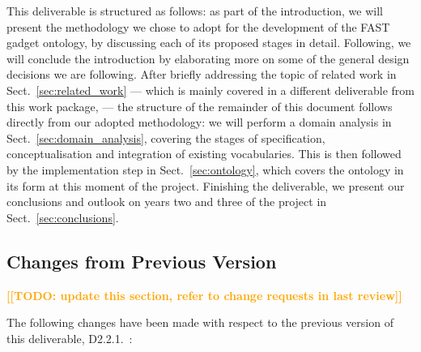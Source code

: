 \documentclass[twoside]{fast_latex}
\newcommand{\todo}[1]{\textsf{\textbf{\textcolor{Orange}{[[TODO: #1]]}}}}
\newcommand{\todo}[1]{}
\begin{document}
This deliverable is structured as follows: as part of the introduction, we will present the methodology we chose to adopt for the development of the FAST gadget ontology, by discussing  each of its proposed stages in detail. Following, we will conclude the introduction by elaborating more on some of the general design decisions we are following. After briefly addressing the topic of related work in Sect.~\ref{sec:related_work} --- which is mainly covered in a different deliverable from this work package, \cite{urmetzer2010fast_state_of_the_art} --- the structure of the remainder of this document follows directly from our adopted methodology: we will perform a domain analysis in Sect.~\ref{sec:domain_analysis}, covering the stages of specification, conceptualisation and integration of existing vocabularies. This is then followed by the implementation step in Sect.~\ref{sec:ontology}, which covers the ontology in its form at this moment of the project. Finishing the deliverable, we present our conclusions and outlook on years two and three of the project in Sect.~\ref{sec:conclusions}.


\subsection{Changes from Previous Version} %
\label{sub:changes_from_previous_version}

\todo{update this section, refer to change requests in last review}

The following changes have been made with respect to the previous version of this deliverable, D2.2.1.~\cite{moeller2009fast_ontology}:
\end{document}
